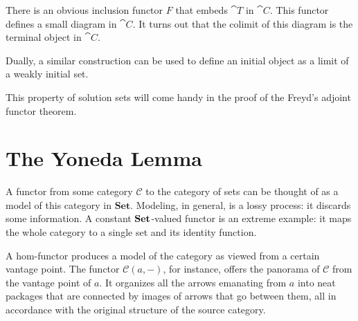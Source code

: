 \documentclass[DaoFP]{subfiles}
\begin{document}
There is an obvious inclusion functor $F$ that embeds $\cat T$ in $\cat C$. This functor defines a small diagram in $\cat C$. It turns out that the colimit of this diagram is the terminal object in $\cat C$.

Dually, a similar construction can be used to define an initial object as a limit of a weakly initial set.

This property of solution sets will come handy in the proof of the Freyd's adjoint functor theorem.

\section{The Yoneda Lemma}

A functor from some category $\mathcal{C}$ to the category of sets can be thought of as a model of this category in $\mathbf{Set}$. Modeling, in general, is a lossy process: it discards some information. A constant $\mathbf{Set}$-valued functor is an extreme example: it maps the whole category to a single set and its identity function. 

A hom-functor produces a model of the category as viewed from a certain vantage point. The functor $\mathcal{C}(a, -)$, for instance, offers the panorama of $\mathcal{C}$ from the vantage point of $a$. It organizes all the arrows emanating from $a$ into neat packages that are connected by images of arrows that go between them, all in accordance with the original structure of the source category. 
\end{document}
